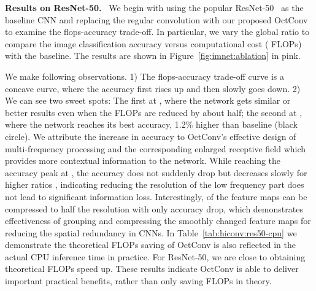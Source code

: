 \documentclass[10pt,twocolumn,letterpaper]{article}
\newcommand{\hiConv}[0]{OctConv\xspace}
\newcommand{\myparagraph}[1]{\vspace{1pt}\noindent\textbf{#1.}~}
\begin{document}
\myparagraph{Results on ResNet-50}
We begin with using the popular ResNet-50~\cite{ResNetV2} as the baseline CNN and replacing the regular convolution with our proposed \hiConv to examine the flops-accuracy trade-off. In particular, we vary the global ratio  to compare the image classification accuracy versus computational cost ( FLOPs)~\cite{ResNetV1,ResNetV2,ResNeXt,DPN} with the baseline. The results are shown in Figure~\ref{fig:imnet:ablation} in pink.

We make following observations. 1) The flops-accuracy trade-off curve is a concave curve, where the accuracy first rises up and then slowly goes down. 2) We can see two sweet spots:  The first at , where the network gets similar or better results even when the FLOPs are reduced by about half;
the second at , where the network reaches its best accuracy, 1.2\% higher than baseline (black circle). We attribute the increase in accuracy to \hiConv's effective design of multi-frequency processing and the corresponding enlarged receptive field which provides more contextual information to the network. While reaching the accuracy peak at , the accuracy does not suddenly drop but decreases slowly for higher ratios , indicating reducing the resolution of the low frequency part does not lead to significant information loss. Interestingly,  of the feature maps can be compressed to half the resolution with only  accuracy drop, which demonstrates effectiveness of grouping and compressing the smoothly changed feature maps for reducing the spatial redundancy in CNNs. In Table~\ref{tab:hiconv:res50-cpu} we demonstrate the theoretical FLOPs saving of \hiConv is also reflected in the actual CPU inference time in practice. For ResNet-50, we are close to obtaining theoretical FLOPs speed up. These results indicate \hiConv is able to deliver important practical benefits, rather than only saving FLOPs in theory.
\end{document}
